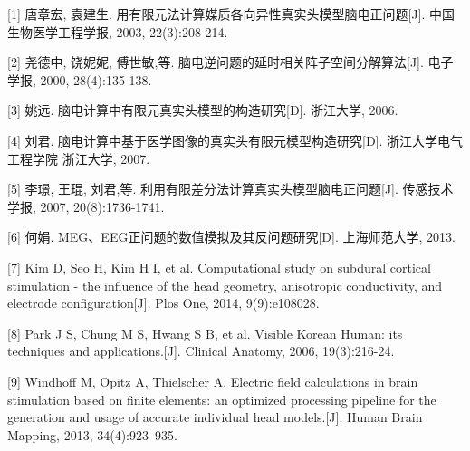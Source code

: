 \begin{spacing}{1.1}
        \noindent {} \setlength{\hangindent}{2.5em} [1]	唐章宏, 袁建生. 用有限元法计算媒质各向异性真实头模型脑电正问题[J]. 中国生物医学工程学报, 2003, 22(3):208-214.
        
        \noindent {} \setlength{\hangindent}{2.5em} [2]	尧德中, 饶妮妮, 傅世敏,等. 脑电逆问题的延时相关阵子空间分解算法[J]. 电子学报, 2000, 28(4):135-138.

        \noindent {} \setlength{\hangindent}{2.5em}  [3]	姚远. 脑电计算中有限元真实头模型的构造研究[D]. 浙江大学, 2006.

        \noindent {} \setlength{\hangindent}{2.5em} [4]	刘君. 脑电计算中基于医学图像的真实头有限元模型构造研究[D]. 浙江大学电气工程学院 浙江大学, 2007.

        \noindent {} \setlength{\hangindent}{2.5em} [5]	李璟, 王琨, 刘君,等. 利用有限差分法计算真实头模型脑电正问题[J]. 传感技术学报, 2007, 20(8):1736-1741.

        \noindent {} \setlength{\hangindent}{2.5em}  [6]	何娟. MEG、EEG正问题的数值模拟及其反问题研究[D]. 上海师范大学, 2013.

        \noindent {} \setlength{\hangindent}{2.5em}  [7]	Kim D, Seo H, Kim H I, et al. Computational study on subdural cortical stimulation - the influence of the head geometry, anisotropic conductivity, and electrode configuration[J]. Plos One, 2014, 9(9):e108028.

        \noindent {} \setlength{\hangindent}{2.5em}  [8]	Park J S, Chung M S, Hwang S B, et al. Visible Korean Human: its techniques and applications.[J]. Clinical Anatomy, 2006, 19(3):216-24.

        \noindent {} \setlength{\hangindent}{2.5em}  [9]	Windhoff M, Opitz A, Thielscher A. Electric field calculations in brain stimulation based on finite elements: an optimized processing pipeline for the generation and usage of accurate individual head models.[J]. Human Brain Mapping, 2013, 34(4):923–935.
\end{spacing}
\newpage